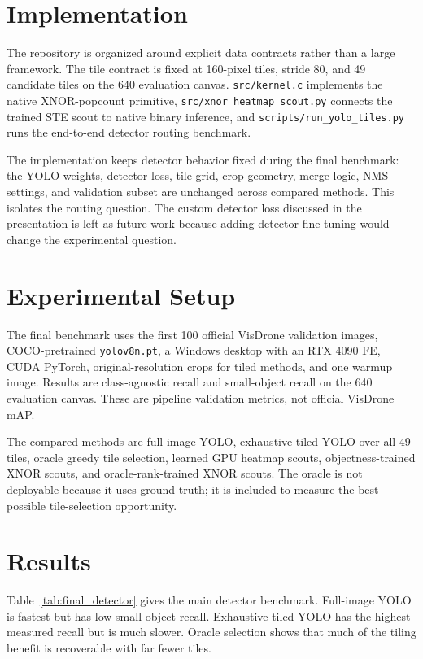 \documentclass[conference]{IEEEtran}
\begin{document}
\section{Implementation}
The repository is organized around explicit data contracts rather than a large framework. The tile contract is fixed at 160-pixel tiles, stride 80, and 49 candidate tiles on the 640 evaluation canvas. \texttt{src/kernel.c} implements the native XNOR-popcount primitive, \texttt{src/xnor\_heatmap\_scout.py} connects the trained STE scout to native binary inference, and \texttt{scripts/run\_yolo\_tiles.py} runs the end-to-end detector routing benchmark.

The implementation keeps detector behavior fixed during the final benchmark: the YOLO weights, detector loss, tile grid, crop geometry, merge logic, NMS settings, and validation subset are unchanged across compared methods. This isolates the routing question. The custom detector loss discussed in the presentation is left as future work because adding detector fine-tuning would change the experimental question.

\section{Experimental Setup}
The final benchmark uses the first 100 official VisDrone validation images, COCO-pretrained \texttt{yolov8n.pt}, a Windows desktop with an RTX 4090 FE, CUDA PyTorch, original-resolution crops for tiled methods, and one warmup image. Results are class-agnostic recall and small-object recall on the 640 evaluation canvas. These are pipeline validation metrics, not official VisDrone mAP.

The compared methods are full-image YOLO, exhaustive tiled YOLO over all 49 tiles, oracle greedy tile selection, learned GPU heatmap scouts, objectness-trained XNOR scouts, and oracle-rank-trained XNOR scouts. The oracle is not deployable because it uses ground truth; it is included to measure the best possible tile-selection opportunity.

\section{Results}
Table~\ref{tab:final_detector} gives the main detector benchmark. Full-image YOLO is fastest but has low small-object recall. Exhaustive tiled YOLO has the highest measured recall but is much slower. Oracle selection shows that much of the tiling benefit is recoverable with far fewer tiles.
\end{document}
